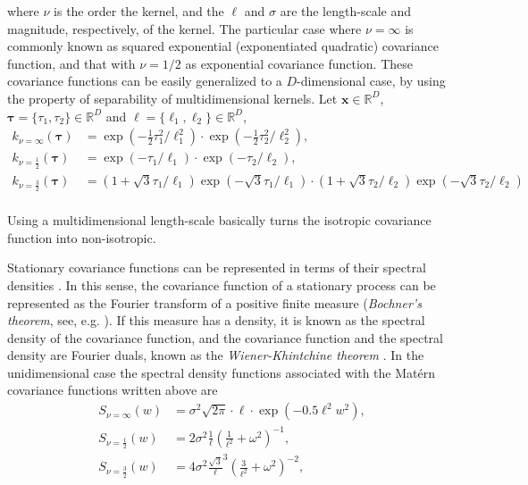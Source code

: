 \documentclass[]{interact}
\theoremstyle{plain}%
\theoremstyle{definition}
\theoremstyle{remark}
\begin{document}
\noindent where $\nu$ is the order the kernel, and the $\ell$ and $\sigma$ are the length-scale and magnitude, respectively, of the kernel. The particular case where $\nu=\infty$ is commonly known as squared exponential (exponentiated quadratic) covariance function, and that with $\nu=1/2$ as exponential covariance function. These covariance functions can be easily generalized to a $D$-dimensional case, by using the property of separability of multidimensional kernels. Let $\mathbf{x}\in \mathbb{R}^D$, $\mathbf{\bm{\tau}}=\{\tau_1,\tau_2\}\in \mathbb{R}^D$ and $\boldsymbol{\ell}=\{\ell_1,\ell_2\}\in \mathbb{R}^D$,
%
\begin{align*}
k_{\nu=\infty}(\bm{\tau})&=\exp(-\frac{1}{2} \tau_1^2/\ell_1^2) \cdot \exp(-\frac{1}{2} \tau_2^2/\ell_2^2), \\
k_{\nu=\frac{1}{2}}(\bm{\tau})&=\exp(-\tau_1/\ell_1) \cdot \exp(-\tau_2/\ell_2), \\
k_{\nu=\frac{3}{2}}(\bm{\tau})&=(1+\sqrt{3}\tau_1/\ell_1) \exp(-\sqrt{3}\tau_1/\ell_1) \cdot (1+\sqrt{3}\tau_2/\ell_2) \exp(-\sqrt{3}\tau_2/\ell_2) \\
\end{align*}

\noindent Using a multidimensional length-scale basically turns the isotropic covariance function into non-isotropic. 

Stationary covariance functions can be represented in terms of their spectral densities \citep{rasmussen2006gaussian}. In this sense, the covariance function of a stationary process can be represented as the Fourier transform of a positive finite measure (\textit{Bochner's theorem}, see, e.g. \cite{akhiezer1993theory}). If this measure has a density, it is known as the spectral density of the covariance function, and the covariance function and the spectral density are Fourier duals, known as the \textit{Wiener-Khintchine theorem} \citep{rasmussen2006gaussian}. In the unidimensional case the spectral density functions associated with the Mat\'ern covariance functions written above are
%
\begin{align}
S_{\nu=\infty}(w)&= \sigma^2 \sqrt{2\pi} \cdot \ell \cdot \exp\left(-0.5 \ell^2 w^2\right), \label{eq:specdens_inf}  \\
S_{\nu=\frac{1}{2}}(w)&= 2\sigma^2 \frac{1}{\ell}\left(\frac{1}{\ell^2} + \omega^2\right)^{-1}, \label{eq:specdens_12}  \\
S_{\nu=\frac{3}{2}}(w)&= 4\sigma^2 \frac{\sqrt{3}}{\ell}^{3}\left(\frac{3}{\ell^2} + \omega^2\right)^{-2}, \label{eq:specdens_32} \\
\end{align}
\end{document}
